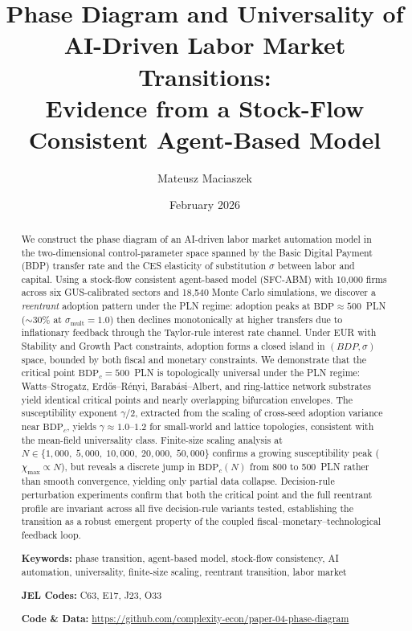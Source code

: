 \documentclass[12pt,a4paper]{article}
\title{\textbf{Phase Diagram and Universality of AI-Driven Labor Market Transitions:\\
Evidence from a Stock-Flow Consistent Agent-Based Model}}
\author{Mateusz Maciaszek}
\date{{\small February 2026}}
\begin{document}
\maketitle

\begin{abstract}
We construct the phase diagram of an AI-driven labor market automation
model in the two-dimensional control-parameter space spanned by the Basic
Digital Payment (BDP) transfer rate and the CES elasticity of substitution
$\sigma$ between labor and capital. Using a stock-flow consistent agent-based
model (SFC-ABM) with 10{,}000 firms across six GUS-calibrated sectors and
18{,}540 Monte Carlo simulations, we discover a \emph{reentrant} adoption
pattern under the PLN regime: adoption peaks at $\mathrm{BDP} \approx 500$~PLN
($\sim$30\% at $\sigma_{\mathrm{mult}} = 1.0$) then declines monotonically
at higher transfers due to inflationary feedback through the Taylor-rule
interest rate channel. Under EUR with Stability and Growth Pact constraints,
adoption forms a closed island in $(BDP, \sigma)$ space, bounded by both
fiscal and monetary constraints. We demonstrate that the critical point
$\mathrm{BDP}_c = 500$~PLN is topologically universal under the PLN regime:
Watts--Strogatz, Erd\H{o}s--R\'{e}nyi, Barab\'{a}si--Albert, and ring-lattice
network substrates yield identical critical points and nearly overlapping
bifurcation envelopes. The susceptibility exponent $\gamma/2$, extracted from
the scaling of cross-seed adoption variance near $\mathrm{BDP}_c$, yields
$\gamma \approx 1.0$--$1.2$ for small-world and lattice topologies, consistent
with the mean-field universality class. Finite-size scaling analysis at
$N \in \{1{,}000,\; 5{,}000,\; 10{,}000,\; 20{,}000,\; 50{,}000\}$ confirms
a growing susceptibility peak ($\chi_{\max} \propto N$), but reveals a discrete
jump in $\mathrm{BDP}_c(N)$ from 800 to 500~PLN rather than smooth convergence,
yielding only partial data collapse. Decision-rule perturbation experiments
confirm that both the critical point and the full reentrant profile are
invariant across all five decision-rule variants tested, establishing the
transition as a robust emergent property of the coupled
fiscal--monetary--technological feedback loop.

\medskip\noindent
\textbf{Keywords:} phase transition, agent-based model, stock-flow consistency,
AI automation, universality, finite-size scaling, reentrant transition,
labor market

\medskip\noindent
\textbf{JEL Codes:} C63, E17, J23, O33

\medskip\noindent
\textbf{Code \& Data:} \url{https://github.com/complexity-econ/paper-04-phase-diagram}
\end{abstract}
\end{document}
